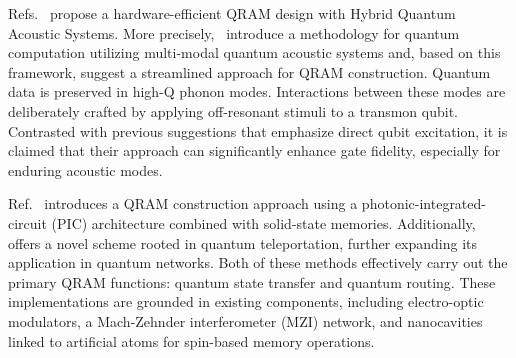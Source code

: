 Refs.~\cite{hann2019hardware,hann2021resilience,connorthesis} propose a hardware-efficient QRAM design with Hybrid Quantum Acoustic Systems. More precisely,~\cite{hann2019hardware,hann2021resilience,connorthesis} introduce a methodology for quantum computation utilizing multi-modal quantum acoustic systems and, based on this framework, suggest a streamlined approach for QRAM construction. Quantum data is preserved in high-Q phonon modes. Interactions between these modes are deliberately crafted by applying off-resonant stimuli to a transmon qubit. Contrasted with previous suggestions that emphasize direct qubit excitation, it is claimed that their approach can significantly enhance gate fidelity, especially for enduring acoustic modes.

Ref.~\cite{chen2021scalable} introduces a QRAM construction approach using a photonic-integrated-circuit (PIC) architecture combined with solid-state memories. Additionally,~\cite{chen2021scalable} offers a novel scheme rooted in quantum teleportation, further expanding its application in quantum networks. Both of these methods effectively carry out the primary QRAM functions: quantum state transfer and quantum routing. These implementations are grounded in existing components, including electro-optic modulators, a Mach-Zehnder interferometer (MZI) network, and nanocavities linked to artificial atoms for spin-based memory operations.


